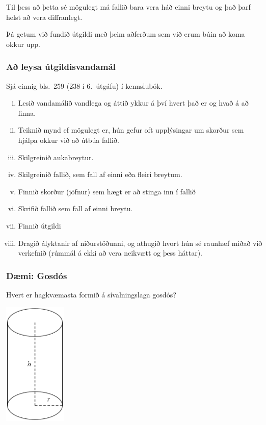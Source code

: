 \documentclass[icelandic,a4paper,12pt]{article}
\begin{document}
 \pause
 
Til þess að þetta sé mögulegt má fallið bara
vera háð einni breytu og það þarf helst að vera
diffranlegt.
 
 \pause
 
Þá getum við fundið útgildi með þeim aðferðum sem
við erum búin að koma okkur upp.

\subsubsection{Að leysa útgildisvandamál}
Sjá einnig bls.~259 (238 í 6.~útgáfu) í kennslubók.
\begin{enumerate}[(i)]
\item Lesið vandamálið vandlega og áttið ykkur á því
hvert það er og hvað á að finna.\pause
\item Teiknið mynd ef mögulegt er, \pause 
hún gefur oft upplýsingar um skorður sem hjálpa
okkur við að útbúa fallið.\pause
\item Skilgreinið aukabreytur.\pause
\item Skilgreinið fallið, sem fall af einni eða fleiri breytum.\pause
\item Finnið skorður (jöfnur) sem hægt er að stinga inn í fallið \pause
\item Skrifið fallið sem fall af einni breytu.\pause
\item Finnið útgildi \pause
\item Dragið ályktanir af niðurstöðunni, \pause
og athugið hvort hún sé raunhæf miðað við verkefnið (rúmmál á ekki að vera 
neikvætt og þess háttar).
\end{enumerate}
 

\subsubsection{Dæmi: Gosdós}
Hvert er hagkvæmasta formið á sívalningslaga gosdós?
\pause
\begin{center}
\includegraphics[width=3cm]{./myndir/kafli05/09_cylinder.png}
\end{center}
\end{document}
